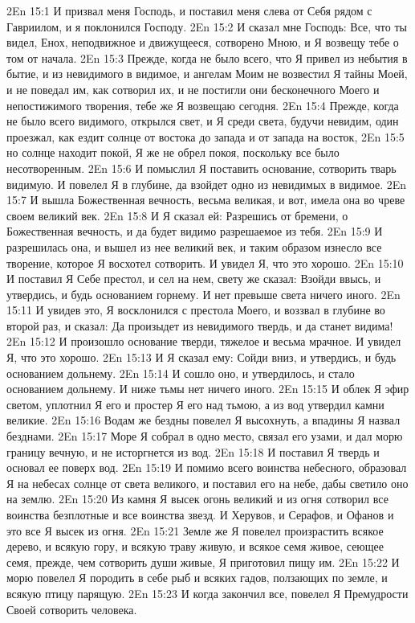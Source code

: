 \vs 2En 15:1
И призвал меня Господь, и поставил меня слева от Себя рядом с Гавриилом, и я поклонился Господу.
\vs 2En 15:2
И сказал мне Господь: Все, что ты видел, Енох, неподвижное и движущееся, сотворено Мною, и Я возвещу тебе о том от начала.
\vs 2En 15:3
Прежде, когда не было всего, что Я привел из небытия в бытие, и из невидимого в видимое, и ангелам Моим не возвестил Я тайны Моей, и не поведал им, как сотворил их, и не постигли они бесконечного Моего и непостижимого творения, тебе же Я возвещаю сегодня.
\vs 2En 15:4
Прежде, когда не было всего видимого, открылся свет, и Я среди света, будучи невидим, один проезжал, как ездит солнце от востока до запада и от запада на восток,
\vs 2En 15:5
но солнце находит покой, Я же не обрел покоя, поскольку все было несотворенным.
\vs 2En 15:6
И помыслил Я поставить основание, сотворить тварь видимую. И повелел Я в глубине, да взойдет одно из невидимых в видимое.
\vs 2En 15:7
И вышла Божественная вечность, весьма великая, и вот, имела она во чреве своем великий век.
\vs 2En 15:8
И Я сказал ей: Разрешись от бремени, о Божественная вечность, и да будет видимо разрешаемое из тебя.
\vs 2En 15:9
И разрешилась она, и вышел из нее великий век, и таким образом изнесло все творение, которое Я восхотел сотворить. И увидел Я, что это хорошо.
\vs 2En 15:10
И поставил Я Себе престол, и сел на нем, свету же сказал: Взойди ввысь, и утвердись, и будь основанием горнему. И нет превыше света ничего иного.
\vs 2En 15:11
И увидев это, Я восклонился с престола Моего, и воззвал в глубине во второй раз, и сказал: Да произыдет из невидимого твердь, и да станет видима!
\vs 2En 15:12
И произошло основание тверди, тяжелое и весьма мрачное. И увидел Я, что это хорошо.
\vs 2En 15:13
И Я сказал ему: Сойди вниз, и утвердись, и будь основанием дольнему.
\vs 2En 15:14
И сошло оно, и утвердилось, и стало основанием дольнему. И ниже тьмы нет ничего иного.
\vs 2En 15:15
И облек Я эфир светом, уплотнил Я его и простер Я его над тьмою, а из вод утвердил камни великие.
\vs 2En 15:16
Водам же бездны повелел Я высохнуть, а впадины Я назвал безднами.
\vs 2En 15:17
Море Я собрал в одно место, связал его узами, и дал морю границу вечную, и не исторгнется из вод.
\vs 2En 15:18
И поставил Я твердь и основал ее поверх вод.
\vs 2En 15:19
И помимо всего воинства небесного, образовал Я на небесах солнце от света великого, и поставил его на небе, дабы светило оно на землю.
\vs 2En 15:20
Из камня Я высек огонь великий и из огня сотворил все воинства безплотные и все воинства звезд. И Херувов, и Серафов, и Офанов и это все Я высек из огня.
\vs 2En 15:21
Земле же Я повелел произрастить всякое дерево, и всякую гору, и всякую траву живую, и всякое семя живое, сеющее семя, прежде, чем сотворить души живые, Я приготовил пищу им.
\vs 2En 15:22
И морю повелел Я породить в себе рыб и всяких гадов, ползающих по земле, и всякую птицу парящую.
\vs 2En 15:23
И когда закончил все, повелел Я Премудрости Своей сотворить человека.

